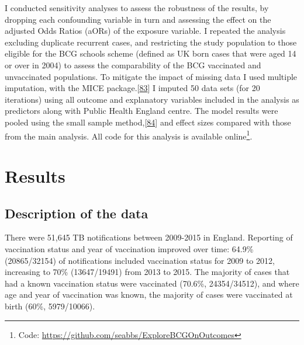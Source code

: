 \documentclass[11pt,twoside]{bristolthesis}
\begin{document}
  I conducted sensitivity analyses to assess the robustness of the results, by dropping each confounding variable in turn and assessing the effect on the adjusted Odds Ratios (aORs) of the exposure variable. I repeated the analysis excluding duplicate recurrent cases, and restricting the study population to those eligible for the BCG schools scheme (defined as UK born cases that were aged 14 or over in 2004) to assess the comparability of the BCG vaccinated and unvaccinated populations. To mitigate the impact of missing data I used multiple imputation, with the MICE package.{[}\protect\hyperlink{ref-VanBuuren2011}{83}{]} I imputed 50 data sets (for 20 iterations) using all outcome and explanatory variables included in the analysis as predictors along with Public Health England centre. The model results were pooled using the small sample method,{[}\protect\hyperlink{ref-Barnard1999}{84}{]} and effect sizes compared with those from the main analysis. All code for this analysis is available online\footnote{Code: \url{https://github.com/seabbs/ExploreBCGOnOutcomes}}.
  
  \hypertarget{results-1}{%
  \section{Results}\label{results-1}}
  
  \hypertarget{description-of-the-data}{%
  \subsection{Description of the data}\label{description-of-the-data}}
  
  There were 51,645 TB notifications between 2009-2015 in England. Reporting of vaccination status and year of vaccination improved over time: 64.9\% (20865/32154) of notifications included vaccination status for 2009 to 2012, increasing to 70\% (13647/19491) from 2013 to 2015. The majority of cases that had a known vaccination status were vaccinated (70.6\%, 24354/34512), and where age and year of vaccination was known, the majority of cases were vaccinated at birth (60\%, 5979/10066).
  
\end{document}
